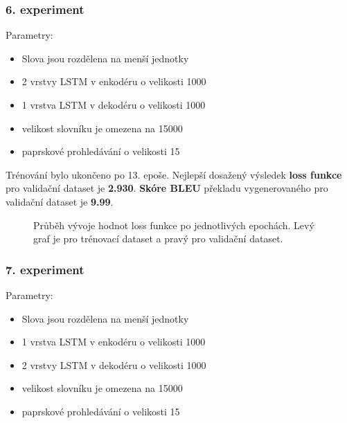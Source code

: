 \subsubsection{6. experiment}\label{experiment6}
Parametry:
\begin{itemize}
  \item Slova jsou rozdělena na menší jednotky
  \item 2 vrstvy LSTM v enkodéru o velikosti 1000
  \item 1 vrstva LSTM v dekodéru o velikosti 1000
  \item velikost slovníku je omezena na 15000
  \item paprskové prohledávání o velikosti 15
\end{itemize}

Trénování bylo ukončeno po 13. epoše. Nejlepší dosažený výsledek \textbf{loss funkce} pro validační dataset je \textbf{2.930}. \textbf{Skóre BLEU} překladu vygenerovaného pro validační dataset je \textbf{9.99}.

\begin{figure}[H]
    \begin{center}
    \end{center}
	\caption{Průběh vývoje hodnot loss funkce po jednotlivých epochách. Levý graf je pro trénovací dataset a pravý pro validační dataset.}
\end{figure}


\subsubsection{7. experiment}\label{experiment7}
Parametry:
\begin{itemize}
  \item Slova jsou rozdělena na menší jednotky
  \item 1 vrstva LSTM v enkodéru o velikosti 1000
  \item 2 vrstvy LSTM v dekodéru o velikosti 1000
  \item velikost slovníku je omezena na 15000
  \item paprskové prohledávání o velikosti 15
\end{itemize}

